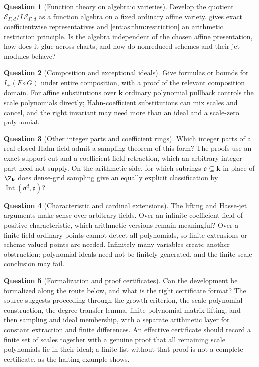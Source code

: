 \documentclass[11pt]{article}
\theoremstyle{plain}
\theoremstyle{plain}
\theoremstyle{plain}
\theoremstyle{definition}
\theoremstyle{definition}
\theoremstyle{definition}
\theoremstyle{definition}
\newtheorem{question}[question]{Question}
\theoremstyle{remark}
\newcommand{\K}{K_\Gamma}\newcommand{\KD}{K_\Delta}
\newcommand{\kk}{\mathbf k}\newcommand{\PP}{\mathbb P}
\newcommand{\Oz}{\mathbf{Oz}}\newcommand{\Ed}{\mathcal E_{\Gamma,d}}
\newcommand{\Zk}{\Z_{\kk}}\newcommand{\OzK}{\Oz_{\K}}
\DeclareMathOperator{\Int}{Int}\DeclareMathOperator{\ct}{ct}
\begin{document}
\begin{question}[Function theory on algebraic varieties]
\label{ent:as:q:varieties}
Develop the quotient $\Ed/I\,\Ed$ as a function algebra on a fixed ordinary
affine variety.  gives exact coefficientwise
representatives and \cref{ent:as:thm:restriction} an arithmetic restriction
principle. Is the algebra independent of the chosen affine presentation, how
does it glue across charts, and how do nonreduced schemes and their jet modules
behave?
\end{question}

\begin{question}[Composition and exceptional ideals]
\label{ent:as:q:composition}
Give formulas or bounds for $I_+(F\circ G)$ under entire composition, with a
proof of the relevant composition domain. For affine substitutions over $\kk$
ordinary polynomial pullback controls the scale polynomials directly;
Hahn-coefficient substitutions can mix scales and cancel, and the right
invariant may need more than an ideal and a scale-zero polynomial.
\end{question}

\begin{question}[Other integer parts and coefficient rings]
\label{ent:as:q:integer-parts}
Which integer parts of a real closed Hahn field admit a sampling theorem of
this form? The proofs use an exact support cut and a coefficient-field
retraction, which an arbitrary integer part need not supply. On the arithmetic
side, for which subrings $\mathfrak o\subseteq\kk$ in place of $\Zk$ does
dense-grid sampling give an equally explicit classification by
$\Int(\mathfrak o^d,\mathfrak o)$?
\end{question}

\begin{question}[Characteristic and cardinal extensions]
\label{ent:as:q:characteristic}
The lifting and Hasse-jet arguments make sense over arbitrary fields. Over an
infinite coefficient field of positive characteristic, which arithmetic
versions remain meaningful? Over a finite field ordinary points cannot detect
all polynomials, so finite extensions or scheme-valued points are needed.
Infinitely many variables create another obstruction: polynomial ideals need
not be finitely generated, and the finite-scale conclusion may fail.
\end{question}

\begin{question}[Formalization and proof certificates]
\label{ent:as:q:formalization}
Can the development be formalized along the route below, and what is the right
certificate format? The source suggests proceeding through the growth
criterion, the scale-polynomial construction, the degree-transfer lemma,
finite polynomial matrix lifting, and then sampling and ideal membership, with
a separate arithmetic layer for constant extraction and finite differences.
An effective certificate should record a finite set of scales together with a
genuine proof that all remaining scale polynomials lie in their ideal; a
finite list without that proof is not a complete certificate, as the halting
example shows.
\end{question}
\end{document}
